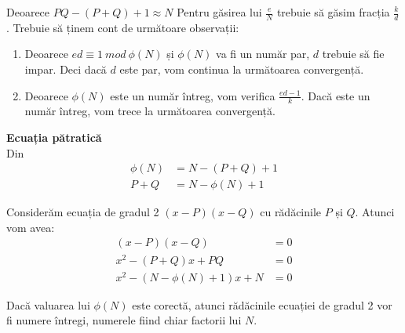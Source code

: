 \documentclass[12]{report}
\begin{document}
Deoarece $PQ - (P+Q)+1 \approx N$
Pentru găsirea lui $\frac{e}{N}$ trebuie să găsim fracția $\frac{k}{d}$. Trebuie să ținem cont de următoare observații:
\begin{enumerate}
\item Deoarece $ed \equiv 1 \ mod \ \phi(N)$ și $\phi(N)$ va fi un număr par, $d$ trebuie să fie impar. Deci dacă $d$ este par, vom continua la următoarea convergență.

\item Deoarece $\phi(N)$ este un număr întreg, vom verifica  $\frac{ed -1}{k}$. Dacă este un număr întreg, vom trece la următoarea convergență.

\end{enumerate}
\textbf{Ecuația pătratică} \\
Din
\begin{align*}
 \phi(N)&=N-(P+Q)+1 \\
 P+Q &= N - \phi(N) +1 
\end{align*}

Considerăm ecuația de gradul 2 $(x-P)(x-Q)$ cu rădăcinile $P$ și $Q$. Atunci vom avea:
\begin{align*}
(x-P)(x-Q)&=0\\
x^2 - (P+Q)x + PQ &= 0\\
x^2 - (N- \phi(N)+1)x + N &=0
\end{align*}

Dacă valuarea lui $\phi(N)$ este corectă, atunci rădăcinile ecuației de gradul 2 vor fi numere întregi, numerele fiind chiar factorii lui $N$. \\
\end{document}
